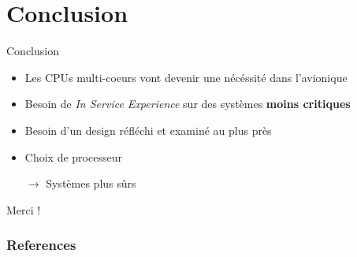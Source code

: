 \documentclass{beamer}
\begin{document}
\section{Conclusion}

\begin{frame}{Conclusion}
	\begin{itemize}
		\item Les CPUs multi-coeurs vont devenir une nécéssité dans l'avionique\pause
		\item Besoin de \textit{In Service Experience} sur des systèmes \textbf{moins
			critiques}\pause
		\item Besoin d'un design réfléchi et examiné au plus près \pause
		\item Choix de processeur\pause
		\item[$\rightarrow$] Systèmes plus sûrs\pause
	\end{itemize}

	\begin{center}
		\textcolor{polymtlred}{Merci !}
	\end{center}
\end{frame}

\begin{frame}[allowframebreaks]
        \frametitle{References}
        
        
\end{frame}
\end{document}
